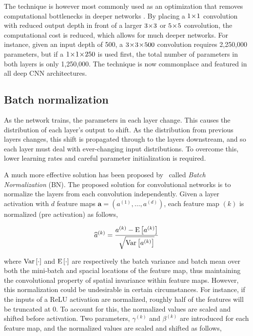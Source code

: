 The technique is however most commonly used as an optimization that removes computational bottlenecks in deeper networks \parencite{szegedy2014going}.
By placing a \(1\!\times \! 1\) convolution with reduced output depth in front of a larger \(3\!\times \! 3\) or \(5\!\times \! 5\) convolution, the computational cost is reduced, which allows for much deeper networks. For instance, given an input depth of 500, a \(3\!\times \! 3 \!\times \! 500\) convolution requires 2,250,000 parameters, but if a \(1\!\times \! 1 \!\times \! 250\) is used first, the total number of parameters in both layers is only 1,250,000.
The technique is now commonplace and featured in all deep CNN architectures.

\subsection{Batch normalization}
As the network trains, the parameters in each layer change. This causes the distribution of each layer’s output to shift.
As the distribution from previous layers changes, this shift is propagated through to the layers downstream, and so each layer must deal with ever-changing input distributions.
To overcome this, lower learning rates and careful parameter initialization is required.

A much more effective solution has been proposed by\ \textcite{ioffe2015batch} called \textit{Batch Normalization} (BN).
The proposed solution for convolutional networks is to normalize the layers from each convolution independently. Given a layer activation with \(d\) feature maps \(\mathbf{a}=\left(a^{(1)},\dots,a^{(d)}\right)\), each feature map \((k)\) is normalized (pre activation) as follows,

\begin{equation*}
  \widehat{a}^{(k)}=\frac{a^{(k)}-\text{E}\left[a^{(k)}\right]}{\sqrt{\text{Var}\left[a^{(k)}\right]}}
\end{equation*}

where \(\text{Var}\left[\cdot\right]\) and \(\text{E}\left[\cdot\right]\) are respectively the batch variance and batch mean over both the mini-batch and spacial locations of the feature map, thus maintaining the convolutional property of spatial invariance within feature maps.
However, this normalization could be undesirable in certain circumstances.
For instance, if the inputs of a ReLU activation are normalized, roughly half of the features will be truncated at 0.
To account for this, the normalized values are scaled and shifted before activation.
Two parameters, \(\gamma^{(k)}\) and \(\beta^{(k)}\) are introduced for each feature map, and the normalized values are scaled and shifted as follows,

